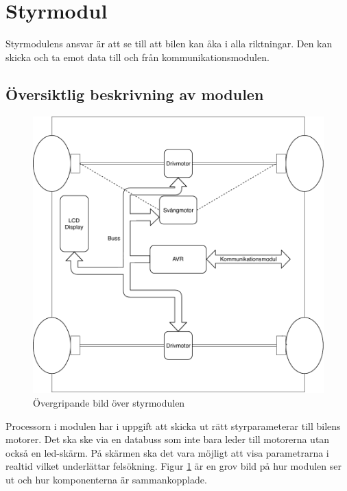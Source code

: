 \documentclass[systemskiss/skiss.tex]{subfiles}
\begin{document}
\section{Styrmodul}
Styrmodulens ansvar är att se till att bilen kan åka i alla riktningar. Den kan skicka och ta emot data till och från kommunikationsmodulen. 
\subsection{Översiktlig beskrivning av modulen}
\begin{figure}[h]
    \centering
    \includegraphics[width=0.6\linewidth]{systemskiss/figures/styrmodul.pdf}
    \caption{Övergripande bild över styrmodulen}
    \label{fig:styrskiss}
\end{figure}

Processorn i modulen har i uppgift att skicka ut rätt styrparameterar till bilens motorer. Det ska ske via en databuss som inte bara leder till motorerna utan också en led-skärm. På skärmen ska det vara möjligt att visa parametrarna i realtid vilket underlättar felsökning. Figur \ref{fig:styrskiss} är en grov bild på hur modulen ser ut och hur komponenterna är sammankopplade.
\end{document}
